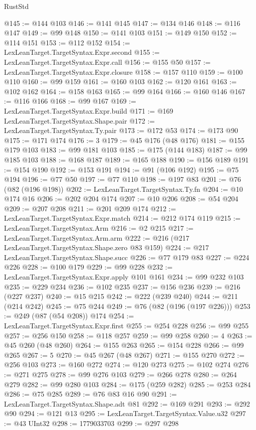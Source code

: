 \begin{lexlean}{RustStd}
\begin{coremodule}
@145 := @144 @103
@146 := @141 @145
@147 := @134 @146
@148 := @116 @147
@149 := @99 @148
@150 := @141 @103
@151 := @149 @150
@152 := @114 @151
@153 := @112 @152
@154 := LexLeanTarget.TargetSyntax.Expr.second
@155 := LexLeanTarget.TargetSyntax.Expr.call
@156 := @155 @50
@157 := LexLeanTarget.TargetSyntax.Expr.closure
@158 := @157 @110
@159 := @100 @110
@160 := @99 @159
@161 := @160 @103
@162 := @120 @161
@163 := @102 @162
@164 := @158 @163
@165 := @99 @164
@166 := @160 @146
@167 := @116 @166
@168 := @99 @167
@169 := LexLeanTarget.TargetSyntax.Expr.build
@171 := @169 LexLeanTarget.TargetSyntax.Shape.pair
@172 := LexLeanTarget.TargetSyntax.Ty.pair
@173 := @172 @53
@174 := @173 @90
@175 := @171 @174
@176 := 3
@179 := @45 @176 (@48 @176)
@181 := @155 @179 @103
@183 := @99 @181 @103
@185 := @175 (@144 @183)
@187 := @99 @185 @103
@188 := @168 @187
@189 := @165 @188
@190 := @156 @189
@191 := @154 @190
@192 := @153 @191
@194 := @91 (@106 @192)
@195 := @75 @194
@196 := @77 @50
@197 := @77 @110
@198 := @197 @83
@201 := @76 (@82 (@196 @198))
@202 := LexLeanTarget.TargetSyntax.Ty.fn
@204 := @10 @174 @16
@206 := @202 @204 @174
@207 := @10 @206
@208 := @54 @204
@209 := @207 @208
@211 := @201 @209 @174
@212 := LexLeanTarget.TargetSyntax.Expr.match
@214 := @212 @174 @119
@215 := LexLeanTarget.TargetSyntax.Arm
@216 := @2 @215
@217 := LexLeanTarget.TargetSyntax.Arm.arm
@222 := @216 (@217 LexLeanTarget.TargetSyntax.Shape.zero @83 @159)
@224 := @217 LexLeanTarget.TargetSyntax.Shape.succ
@226 := @77 @179 @83
@227 := @224 @226
@228 := @100 @179
@229 := @99 @228
@232 := LexLeanTarget.TargetSyntax.Expr.apply @101 @161
@234 := @99 @232 @103
@235 := @229 @234
@236 := @102 @235
@237 := @156 @236
@239 := @216 (@227 @237)
@240 := @15 @215
@242 := @222 (@239 @240)
@244 := @211 (@214 @242)
@245 := @75 @244
@249 := @76 (@82 (@196 (@197 @226)))
@253 := @249 (@87 (@54 @208)) @174
@254 := LexLeanTarget.TargetSyntax.Expr.first
@255 := @254 @228
@256 := @99 @255
@257 := @256 @150
@258 := @118 @257
@259 := @99 @258
@260 := 4
@263 := @45 @260 (@48 @260)
@264 := @155 @263
@265 := @154 @228
@266 := @99 @265
@267 := 5
@270 := @45 @267 (@48 @267)
@271 := @155 @270
@272 := @256 @103
@273 := @160 @272
@274 := @120 @273
@275 := @102 @274
@276 := @271 @275
@278 := @99 @276 @103
@279 := @266 @278
@280 := @264 @279
@282 := @99 @280 @103
@284 := @175 (@259 @282)
@285 := @253 @284
@286 := @75 @285
@289 := @76 @83 @16 @90
@291 := LexLeanTarget.TargetSyntax.Shape.adt @81
@292 := @169 @291
@293 := @292 @90
@294 := @121 @13
@295 := LexLeanTarget.TargetSyntax.Value.u32
@297 := @43 UInt32
@298 := 1779033703
@299 := @297 @298

\end{coremodule}
\end{lexlean}

